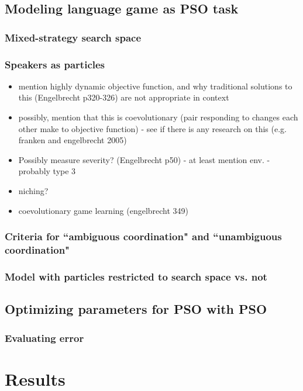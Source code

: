 \documentclass[12pt,a4paper]{article}
\begin{document}
\subsection{Modeling language game as PSO task}
\subsubsection{Mixed-strategy search space}
\subsubsection{Speakers as particles}
\begin{itemize}
\item mention highly dynamic objective function, and why traditional solutions to this (Engelbrecht p320-326) are not appropriate in context

\item possibly, mention that this is coevolutionary (pair responding to changes each other make to objective function) - see if there is any research on this (e.g. franken and engelbrecht 2005)

\item Possibly measure severity? (Engelbrecht p50) - at least mention env. - probably type 3

\item niching? 

\item coevolutionary game learning (engelbrecht 349)
\end{itemize}
\subsubsection{Criteria for ``ambiguous coordination" and ``unambiguous coordination"}
\subsubsection{Model with particles restricted to search space vs. not}

\subsection{Optimizing parameters for PSO with PSO}
\subsubsection{Evaluating error}

\section{Results}
\end{document}
